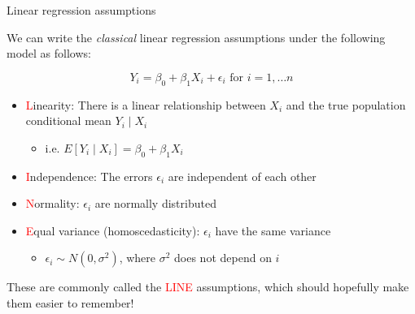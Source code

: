 \documentclass[10pt,t]{beamer}
\begin{document}
\begin{frame}{Linear regression assumptions}
	\vspace{-5 mm}
	
We can write the {\color{blue}\textit{classical}} linear regression assumptions under the following model as follows:

$$
Y_i = \beta_0 + \beta_1 X_i + \epsilon_i \text{ for } i = 1, \dots n
$$

\begin{itemize}
	\item \textcolor{red}{L}inearity: There is a linear relationship between $X_i$ and the true population conditional mean $Y_i \mid X_i$
	\smallskip
	\begin{itemize}
		\item i.e. $E[Y_i \mid X_i] = \beta_0 + \beta_1 X_i$
	\end{itemize}
\medskip
	\item \textcolor{red}{I}ndependence: The errors $\epsilon_i$ are independent of each other
	\medskip
	\item \textcolor{red}{N}ormality: $\epsilon_i$ are normally distributed
	\medskip
	\item \textcolor{red}{E}qual variance (homoscedasticity): $\epsilon_i$ have the same variance
	\smallskip
	\begin{itemize}
		\item $\epsilon_i \sim N(0, \sigma^2)$, where $\sigma^2$ does not depend on $i$
	\end{itemize}
\end{itemize}

\vspace{0.3cm}

These are commonly called the \textcolor{red}{LINE} assumptions, which should hopefully make them easier to remember!
\end{frame}
\end{document}
